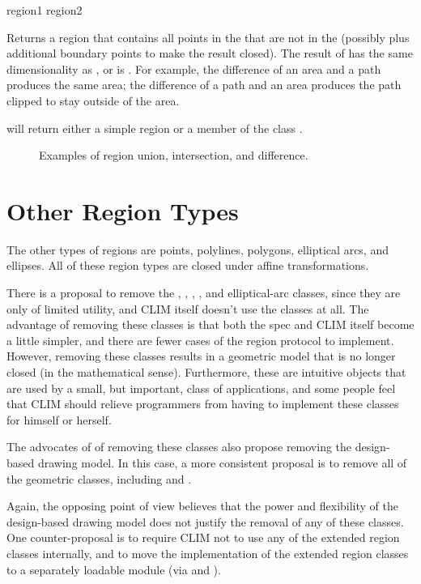  {region1 region2}

Returns a region that contains all points in the  
that are not in the   (possibly plus additional
boundary points to make the result closed).  The result of
 has the same dimensionality as , or is
.  For example, the difference of an area and a path produces the
same area; the difference of a path and an area produces the path clipped to
stay outside of the area.

 will return either a simple region or a member of the
class .

\MayCaptureInputs


\begin{figure}
\ifpsfig\centerline{}\else\vspace{2.0in}\fi
\caption{Examples of region union, intersection, and difference.}
\end{figure}


\section {Other Region Types}

The other types of regions are points, polylines, polygons, elliptical arcs, and
ellipses.  All of these region types are closed under affine transformations.

 {There is a proposal to remove the , ,
, , and {elliptical-arc} classes, since they are only of
limited utility, and CLIM itself doesn't use the classes at all.  The advantage
of removing these classes is that both the spec and CLIM itself become a little
simpler, and there are fewer cases of the region protocol to implement.
However, removing these classes results in a geometric model that is no longer
closed (in the mathematical sense).  Furthermore, these are intuitive objects
that are used by a small, but important, class of applications, and some people
feel that CLIM should relieve programmers from having to implement these classes
for himself or herself.

The advocates of of removing these classes also propose removing the
design-based drawing model.  In this case, a more consistent proposal is to
remove all of the geometric classes, including  and .

Again, the opposing point of view believes that the power and flexibility of the
design-based drawing model does not justify the removal of any of these classes.
One counter-proposal is to require CLIM not to use any of the extended region
classes internally, and to move the implementation of the extended region
classes to a separately loadable module (via  and ).}

